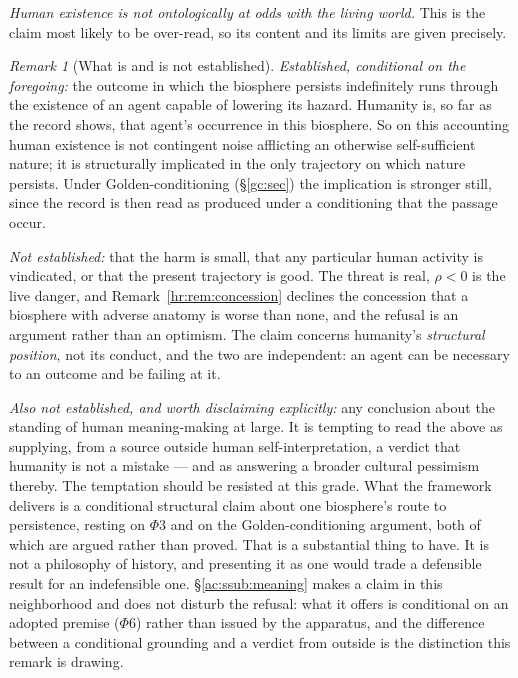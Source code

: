 \documentclass[11pt]{article}
\numberwithin{equation}{section}
\theoremstyle{plain}
\theoremstyle{definition}
\theoremstyle{remark}
\newtheorem{remark}[theorem]{Remark}
\begin{document}
\emph{Human existence is not ontologically at odds with the living
world.} This is the claim most likely to be over-read, so its content
and its limits are given precisely.

\begin{remark}[What is and is not established]\label{hr:rem:notmistake}
\emph{Established, conditional on the foregoing:} the outcome in which
the biosphere persists indefinitely runs through the existence of an
agent capable of lowering its hazard. Humanity is, so far as the record
shows, that agent's occurrence in this biosphere. So on this accounting
human existence is not contingent noise afflicting an otherwise
self-sufficient nature; it is structurally implicated in the only
trajectory on which nature persists. Under Golden-conditioning
(\S\ref{gc:sec}) the implication is stronger still, since the record is
then read as produced under a conditioning that the passage occur.

\emph{Not established:} that the harm is small, that any particular
human activity is vindicated, or that the present trajectory is good.
The threat is real, $\rho<0$ is the live danger, and
Remark~\ref{hr:rem:concession} declines the concession that a biosphere
with adverse anatomy is worse than none, and the refusal is an argument
rather than an optimism. The claim concerns humanity's
\emph{structural position}, not its conduct, and the two are
independent: an agent can be necessary to an outcome and be failing at
it.

\emph{Also not established, and worth disclaiming explicitly:} any
conclusion about the standing of human meaning-making at large. It is
tempting to read the above as supplying, from a source outside human
self-interpretation, a verdict that humanity is not a mistake --- and as
answering a broader cultural pessimism thereby. The temptation should be
resisted at this grade. What the framework delivers is a conditional
structural claim about one biosphere's route to persistence, resting on
$\Phi3$ and on the Golden-conditioning argument, both of which are
argued rather than proved. That is a substantial thing to have. It is
not a philosophy of history, and presenting it as one would trade a
defensible result for an indefensible one. \S\ref{ac:ssub:meaning} makes a
claim in this neighborhood and does not disturb the refusal: what it offers
is conditional on an adopted premise ($\Phi6$) rather than issued by the
apparatus, and the difference between a conditional grounding and a verdict
from outside is the distinction this remark is drawing.
\end{remark}
\end{document}

